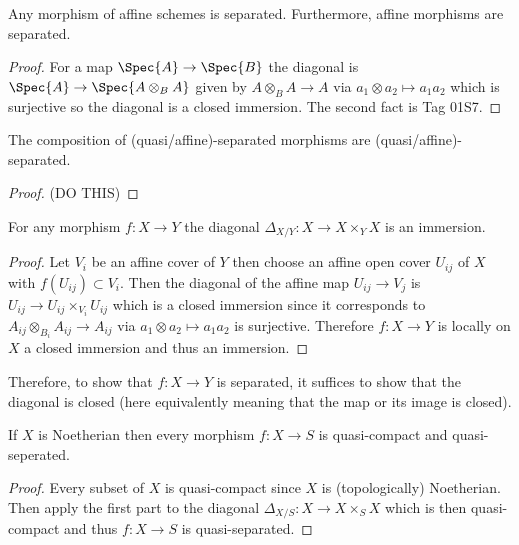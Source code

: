 \documentclass[12pt]{article}
\begin{document}
\begin{lemma}
Any morphism of affine schemes is separated. Furthermore, affine morphisms are separated.
\end{lemma}

\begin{proof}
For a map $\Spec{A} \to \Spec{B}$ the diagonal is $\Spec{A} \to \Spec{A \otimes_B A}$ given by $A \otimes_B A \to A$ via $a_1 \otimes a_2 \mapsto a_1 a_2$ which is surjective so the diagonal is a closed immersion. The second fact is Tag 01S7.
\end{proof}

\begin{lemma}
The composition of (quasi/affine)-separated morphisms are (quasi/affine)-separated. 
\end{lemma}

\begin{proof}
(DO THIS)
\end{proof}

\begin{lemma}
For any morphism $f : X \to Y$ the diagonal $\Delta_{X / Y} : X \to X \times_Y X$ is an immersion.
\end{lemma}

\begin{proof}
Let $V_i$ be an affine cover of $Y$ then choose an affine open cover $U_{ij}$ of $X$ with $f(U_{ij}) \subset V_i$. Then the diagonal of the affine map $U_{ij} \to V_j$ is $U_{ij} \to U_{ij} \times_{V_i} U_{ij}$ which is a closed immersion since it corresponds to $A_{ij} \otimes_{B_i} A_{ij} \to A_{ij}$ via $a_1 \otimes a_2 \mapsto a_1 a_2$ is surjective. Therefore $f : X \to Y$ is locally on $X$ a closed immersion and thus an immersion. 
\end{proof}

\begin{rmk}
Therefore, to show that $f : X \to Y$ is separated, it suffices to show that the diagonal is closed (here equivalently meaning that the map or its image is closed). 
\end{rmk}

\begin{lemma}
If $X$ is Noetherian then every morphism $f : X \to S$ is quasi-compact and quasi-seperated. 
\end{lemma}

\begin{proof}
Every subset of $X$ is quasi-compact since $X$ is (topologically) Noetherian. Then apply the first part to the diagonal $\Delta_{X/S} : X \to X \times_S X$ which is then quasi-compact and thus $f : X \to S$ is quasi-separated.
\end{proof}
\end{document}
